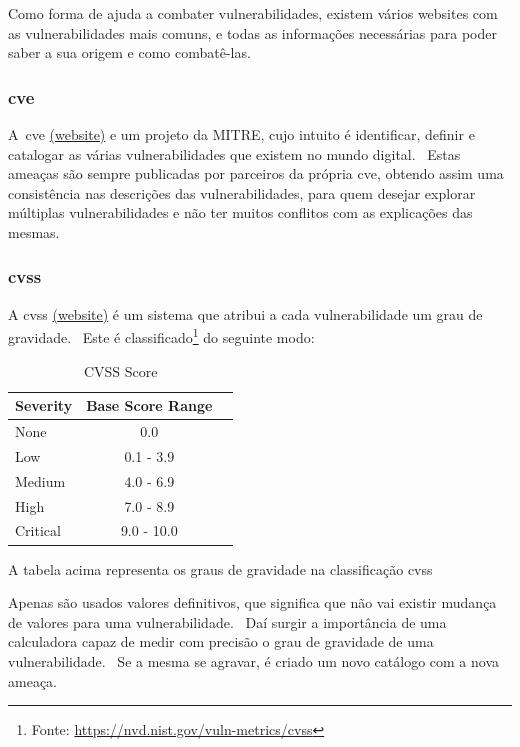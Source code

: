 \documentclass{report}
\begin{document}
Como forma de ajuda a combater vulnerabilidades, existem vários websites com as vulnerabilidades mais comuns, e todas as informações necessárias para poder saber a sua origem e como combatê-las.

\subsubsection{\ac{cve}}
 A~\ac{cve} \href{https://www.cve.org/}{(website)} e um projeto da MITRE, cujo intuito é identificar, definir e catalogar as várias vulnerabilidades que existem no mundo digital. \ Estas ameaças são sempre publicadas por parceiros da própria \ac{cve}, obtendo assim uma consistência nas descrições das vulnerabilidades, para quem desejar explorar múltiplas vulnerabilidades e não ter muitos conflitos com as explicações das mesmas.

\subsubsection{\ac{cvss}}
A \ac{cvss} \href{https://www.first.org/cvss/}{(website)} é um sistema que atribui a cada vulnerabilidade um grau de gravidade. \ Este é classificado\footnote{Fonte: \url{https://nvd.nist.gov/vuln-metrics/cvss}} do seguinte modo:

\begin{table}[htp]
    \begin{center}
    \begin{tabular}{|l||c||r|}
        \hline
            Severity   & Base Score Range \\   \hline\hline
            None       & 0.0          \\       \hline
            Low        & 0.1 - 3.9    \\       \hline
            Medium     & 4.0 - 6.9    \\       \hline
            High       & 7.0 - 8.9    \\       \hline
            Critical   & 9.0 - 10.0   \\       \hline
    \end{tabular}
    \end{center}
    \caption{CVSS Score}
    \centerline{A tabela acima representa os graus de gravidade na classificação \ac{cvss}}
    \label{tab:cvss}
\end{table}

Apenas são usados valores definitivos, que significa que não vai existir mudança de valores para uma vulnerabilidade. \ Daí surgir a importância de uma calculadora capaz de medir com precisão o grau de gravidade de uma vulnerabilidade. \ Se a mesma se agravar, é criado um novo catálogo com a nova ameaça.
\end{document}
